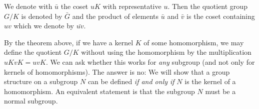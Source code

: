 We denote with $\bar{u}$ the coset $uK$ with representative $u$. Then the quotient group $G/K$ is denoted by $\bar{G}$ and the product of elements $\bar{u}$ and $\bar{v}$ is the coset containing $uv$ which we denote by $\bar{uv}$.


By the theorem above, if we have a kernel $K$ of some homomorphism, we may define the quotient $G/K$ without using the homomorphism by the multiplication $uKvK = uvK$. We can ask whether this works for \emph{any} subgroup (and not only for kernels of homomorphisms). The answer is no: We will show that a group structure on a subgroup $N$ can be defined \emph{if and only if} $N$ is the kernel of a homomorphism. An equivalent statement is that the subgroup $N$ must be a normal subgroup.



